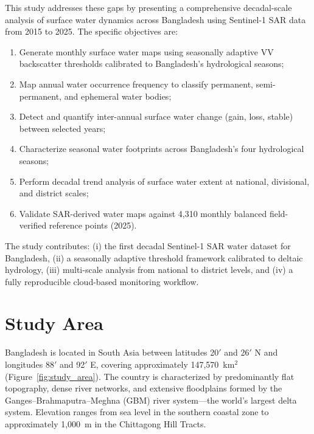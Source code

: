 \documentclass[fleqn,10pt]{article}
\begin{document}
This study addresses these gaps by presenting a comprehensive decadal-scale analysis of surface water dynamics across Bangladesh using Sentinel-1 SAR data from 2015 to 2025. The specific objectives are:
\begin{enumerate}[nosep]
  \item Generate monthly surface water maps using seasonally adaptive VV backscatter thresholds calibrated to Bangladesh's hydrological seasons;
  \item Map annual water occurrence frequency to classify permanent, semi-permanent, and ephemeral water bodies;
  \item Detect and quantify inter-annual surface water change (gain, loss, stable) between selected years;
  \item Characterize seasonal water footprints across Bangladesh's four hydrological seasons;
  \item Perform decadal trend analysis of surface water extent at national, divisional, and district scales;
  \item Validate SAR-derived water maps against 4,310 monthly balanced field-verified reference points (2025).
\end{enumerate}

The study contributes: (i) the first decadal Sentinel-1 SAR water dataset for Bangladesh, (ii) a seasonally adaptive threshold framework calibrated to deltaic hydrology, (iii) multi-scale analysis from national to district levels, and (iv) a fully reproducible cloud-based monitoring workflow.


\section{Study Area}

Bangladesh is located in South Asia between latitudes 20$'$ and 26$'$ N and longitudes 88$'$ and 92$'$ E, covering approximately 147,570~km$^{2}$ (Figure~\ref{fig:study_area}). The country is characterized by predominantly flat topography, dense river networks, and extensive floodplains formed by the Ganges--Brahmaputra--Meghna (GBM) river system---the world's largest delta system. Elevation ranges from sea level in the southern coastal zone to approximately 1,000~m in the Chittagong Hill Tracts.
\end{document}
